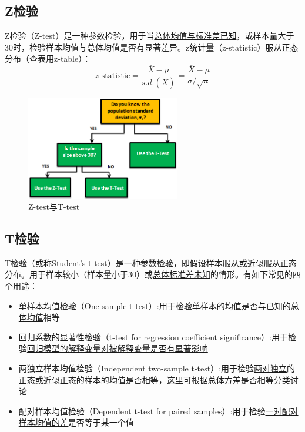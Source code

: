 \documentclass[11pt]{article}
\begin{document}
\subsection{Z检验}

Z检验（Z-test）是一种参数检验，用于当\uline{总体均值与标准差已知}，或样本量大于30时，检验样本均值与总体均值是否有显著差异。z统计量（z-statistic）服从正态分布（查表用z-table）：
\begin{equation*}
    z\text{-statistic} = \frac{\bar{X}-\mu}{s.d.(\bar{X})} = \frac{\bar{X} - \mu}{\sigma/\sqrt{n}}
\end{equation*}

\begin{figure}[H]
    \centering
    \includegraphics[width=0.6\textwidth]{fig/z-vs-t-test.png}
    \caption{Z-test与T-test}
    \label{fig:z-vs-t-test}
\end{figure}

\subsection{T检验}

T检验（或称Student's t test）是一种参数检验，即假设样本服从或近似服从正态分布。用于样本较小（样本量小于30）或\uline{总体标准差未知}的情形。有如下常见的四个用途：
\begin{itemize}
    \item 单样本均值检验（One-sample t-test）:用于检验\uline{单样本的均值}是否与已知的\uline{总体均值}相等
    \item 回归系数的显著性检验（t-test for regression coefficient significance）:用于检验\uline{回归模型的解释变量对被解释变量是否有显著影响}
    \item 两独立样本均值检验（Independent two-sample t-test）:用于检验\uline{两对独立}的正态或近似正态的\uline{样本的均值}是否相等，这里可根据总体方差是否相等分类讨论
    \item 配对样本均值检验（Dependent t-test for paired samples）:用于检验\uline{一对配对样本均值的差}是否等于某一个值
\end{itemize}
\end{document}
